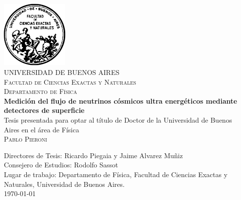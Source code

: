 \begin{titlepage}
\begin{center}


\includegraphics[width=0.25\textwidth]{fig/fceyn_logo.pdf}\\[0.5cm]    

\textsc{\large UNIVERSIDAD DE BUENOS AIRES}\\[0.5cm]

\textsc{\large Facultad de Ciencias Exactas y Naturales}\\[0.5cm]

\textsc{\large Departamento de Física }\\[2.0cm]


\textbf{\Large  Medición del flujo de neutrinos cósmicos ultra energéticos mediante detectores de superficie}\\[1.5cm]

Tesis presentada para optar al título de Doctor de la Universidad de Buenos Aires en el área de Física\\[1.0cm]

\textsc{\Large Pablo Pieroni}\\[1.0cm]

\end{center}

\vfill

\noindent
Directores de Tesis: Ricardo Piegaia y Jaime Alvarez Mu\~niz\\
Consejero de Estudios: Rodolfo Sassot\\[0.5cm]
Lugar de trabajo: Departamento de Física, Facultad de Ciencias Exactas y Naturales, Universidad de Buenos Aires.\\[0.5cm]


\noindent
{\large \today}

\end{titlepage}